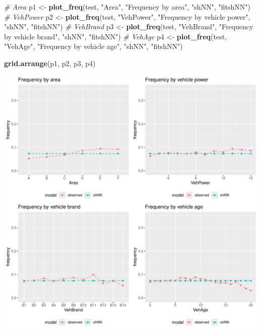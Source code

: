 \documentclass[
]{article}
\newenvironment{Shaded}{\begin{snugshade}}{\end{snugshade}}
\newcommand{\CommentTok}[1]{\textcolor[rgb]{0.56,0.35,0.01}{\textit{#1}}}
\newcommand{\FunctionTok}[1]{\textcolor[rgb]{0.13,0.29,0.53}{\textbf{#1}}}
\newcommand{\NormalTok}[1]{#1}
\newcommand{\OtherTok}[1]{\textcolor[rgb]{0.56,0.35,0.01}{#1}}
\newcommand{\StringTok}[1]{\textcolor[rgb]{0.31,0.60,0.02}{#1}}
\begin{document}
\begin{Shaded}
\begin{Highlighting}[]
\CommentTok{\# Area}
\NormalTok{p1 }\OtherTok{\textless{}{-}} \FunctionTok{plot\_freq}\NormalTok{(test, }\StringTok{"Area"}\NormalTok{, }\StringTok{"Frequency by area"}\NormalTok{, }\StringTok{"shNN"}\NormalTok{, }\StringTok{"fitshNN"}\NormalTok{)}
\CommentTok{\# VehPower}
\NormalTok{p2 }\OtherTok{\textless{}{-}} \FunctionTok{plot\_freq}\NormalTok{(test, }\StringTok{"VehPower"}\NormalTok{, }\StringTok{"Frequency by vehicle power"}\NormalTok{, }\StringTok{"shNN"}\NormalTok{, }\StringTok{"fitshNN"}\NormalTok{)}
\CommentTok{\# VehBrand}
\NormalTok{p3 }\OtherTok{\textless{}{-}} \FunctionTok{plot\_freq}\NormalTok{(test, }\StringTok{"VehBrand"}\NormalTok{, }\StringTok{"Frequency by vehicle brand"}\NormalTok{, }\StringTok{"shNN"}\NormalTok{, }\StringTok{"fitshNN"}\NormalTok{)}
\CommentTok{\# VehAge}
\NormalTok{p4 }\OtherTok{\textless{}{-}} \FunctionTok{plot\_freq}\NormalTok{(test, }\StringTok{"VehAge"}\NormalTok{, }\StringTok{"Frequency by vehicle age"}\NormalTok{, }\StringTok{"shNN"}\NormalTok{, }\StringTok{"fitshNN"}\NormalTok{)}

\FunctionTok{grid.arrange}\NormalTok{(p1, p2, p3, p4)}
\end{Highlighting}
\end{Shaded}

\includegraphics{freMTPLfreq_fnn-zh-cn_files/figure-latex/unnamed-chunk-48-1.pdf}
\end{document}
